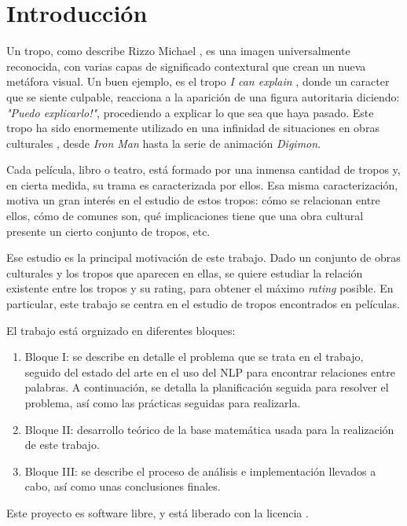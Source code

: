 \chapter{Introducción}

Un tropo, como describe Rizzo Michael \cite{rizzo2013art}, es una imagen universalmente reconocida, con varias capas de significado contextural que crean un nueva metáfora visual. Un buen ejemplo, es el tropo \emph{I can explain} \cite{tropo:ICanExplain}, donde un caracter que se siente culpable, reacciona a la aparición de una figura autoritaria diciendo: \emph{"Puedo explicarlo!"}, procediendo a explicar lo que sea que haya pasado. Este tropo ha sido enormemente utilizado en una infinidad de situaciones en obras culturales \cite{tropo:ICanExplain}, desde \emph{Iron Man} hasta la serie de animación \emph{Digimon}.

Cada película, libro o teatro, está formado por una inmensa cantidad de tropos y, en cierta medida, su trama es caracterizada por ellos. Esa misma caracterización, motiva un gran interés en el estudio de estos tropos: cómo se relacionan entre ellos, cómo de comunes son, qué implicaciones tiene que una obra cultural presente un cierto conjunto de tropos, etc.

Ese estudio es la principal motivación de este trabajo. Dado un conjunto de obras culturales y los tropos que aparecen en ellas, se quiere estudiar la relación existente entre los tropos y su rating, para obtener el máximo \emph{rating} posible. En particular, este trabajo se centra en el estudio de tropos encontrados en películas.


El trabajo está orgnizado en diferentes bloques:

\begin{enumerate}
    \item Bloque I: se describe en detalle el problema que se trata en el trabajo, seguido del estado del arte en el uso del NLP para encontrar relaciones entre palabras. A continuación, se detalla la planificación seguida para resolver el problema, así como las prácticas seguidas para realizarla.
    \item Bloque II: desarrollo teórico de la base matemática usada para la realización de este trabajo.
    \item Bloque III: se describe el proceso de análisis e implementación llevados a cabo, así como unas conclusiones finales.
\end{enumerate}

Este proyecto es software libre, y está liberado con la licencia \cite{gplv3}.